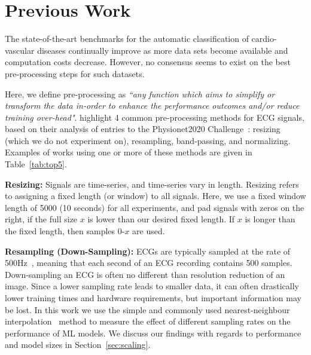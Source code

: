 \documentclass[pmlr,twocolumn]{jmlr}%
\begin{document}
\section{Previous Work}
\label{sec:prevwork}
The state-of-the-art benchmarks for the automatic classification of cardio-vascular diseases continually improve as more data sets become available and computation costs decrease. However, no consensus seems to exist on the best pre-processing steps for such datasets. 

Here, we define pre-processing as \textit{``any function which aims to simplify or transform the data in-order to enhance the performance outcomes and/or reduce training over-head"}. \citet{hong2022practical} highlight 4 common pre-processing methods for ECG signals, based on their analysis of entries to the Physionet2020 Challenge~\citep{goldberger2000physiobank,alday2020classification}: resizing (which we do not experiment on), resampling, band-passing, and normalizing. Examples of works using one or more of these methods are given in Table~\ref{tab:top5}. 

\textbf{Resizing:} 
Signals are time-series, and time-series vary in length. Resizing refers to assigning a fixed length (or window) to all signals. Here, we use a fixed window length of 5000 (10 seconds) for all experiments, and pad signals with zeros on the right, if the full size $x$ is lower than our desired fixed length. If $x$ is longer than the fixed length, then samples 0-$x$ are used. 

\textbf{Resampling (Down-Sampling):}
ECGs are typically sampled at the rate of 500Hz~\citep{luo2010review,uwaechia2021comprehensive}, meaning that each second of an ECG recording contains 500 samples. Down-sampling an ECG is often no different than resolution reduction of an image. Since a lower sampling rate leads to smaller data, it can often drastically lower training times and hardware requirements, but important information may be lost. In this work we use the simple and commonly used nearest-neighbour interpolation~\citep{rukundo2012nearest} method to measure the effect of different sampling rates on the performance of ML models. We discuss our findings with regards to performance and model sizes in Section~\ref{sec:scaling}. 
\end{document}
